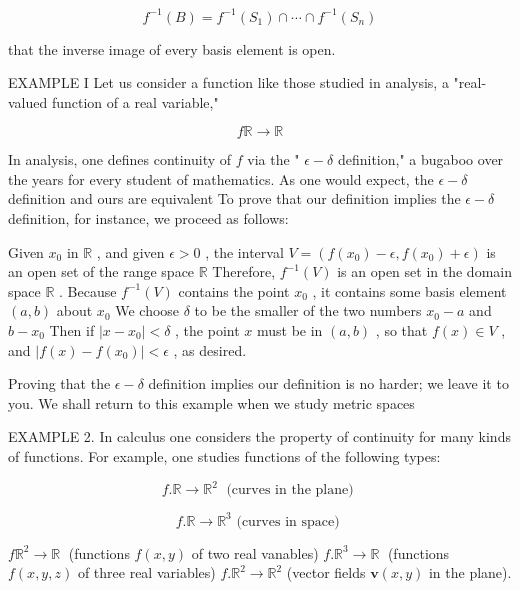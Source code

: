 \documentclass[10pt]{article}
\begin{document}
\[
{f}^{-1}\left( B\right)  = {f}^{-1}\left( {S}_{1}\right)  \cap  \cdots  \cap  {f}^{-1}\left( {S}_{n}\right)
\]

that the inverse image of every basis element is open.

EXAMPLE I Let us consider a function like those studied in analysis, a "real-valued function of a real variable,"

\[
f\mathbb{R} \rightarrow  \mathbb{R}
\]

In analysis, one defines continuity of \(f\) via the " \(\epsilon  - \delta\) definition," a bugaboo over the years for every student of mathematics. As one would expect, the \(\epsilon  - \delta\) definition and ours are equivalent To prove that our definition implies the \(\epsilon  - \delta\) definition, for instance, we proceed as follows:

Given \({x}_{0}\) in \(\mathbb{R}\) , and given \(\epsilon  > 0\) , the interval \(V = \left( {f\left( {x}_{0}\right)  - \epsilon ,f\left( {x}_{0}\right)  + \epsilon }\right)\) is an open set of the range space \(\mathbb{R}\) Therefore, \({f}^{-1}\left( V\right)\) is an open set in the domain space \(\mathbb{R}\) . Because \({f}^{-1}\left( V\right)\) contains the point \({x}_{0}\) , it contains some basis element \(\left( {a,b}\right)\) about \({x}_{0}\) We choose \(\delta\) to be the smaller of the two numbers \({x}_{0} - a\) and \(b - {x}_{0}\) Then if \(\left| {x - {x}_{0}}\right|  < \delta\) , the point \(x\) must be in \(\left( {a,b}\right)\) , so that \(f\left( x\right)  \in  V\) , and \(\left| {f\left( x\right)  - f\left( {x}_{0}\right) }\right|  < \epsilon\) , as desired.

Proving that the \(\epsilon  - \delta\) definition implies our definition is no harder; we leave it to you. We shall return to this example when we study metric spaces

EXAMPLE 2. In calculus one considers the property of continuity for many kinds of functions. For example, one studies functions of the following types:

\[
f.\mathbb{R} \rightarrow  {\mathbb{R}}^{2}\;\text{ (curves in the plane) }
\]

\[
f.\mathbb{R} \rightarrow  {\mathbb{R}}^{3}\text{ (curves in space) }
\]

\(f{\mathbb{R}}^{2} \rightarrow  \mathbb{R}\;\) (functions \(f\left( {x,y}\right)\) of two real vanables) \(f.{\mathbb{R}}^{3} \rightarrow  \mathbb{R}\;\) (functions \(f\left( {x,y,z}\right)\) of three real variables) \(f.{\mathbb{R}}^{2} \rightarrow  {\mathbb{R}}^{2}\) (vector fields \(\mathbf{v}\left( {x,y}\right)\) in the plane).
\end{document}
